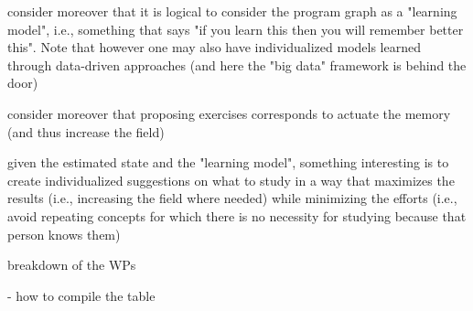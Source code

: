 









consider moreover that it is logical to consider the program graph as a "learning model", i.e., something that says "if you learn this then you will remember better this". Note that however one may also have individualized models learned through data-driven approaches (and here the "big data" framework is behind the door)

consider moreover that proposing exercises corresponds to actuate the memory (and thus increase the field)

given the estimated state and the "learning model", something interesting is to create individualized suggestions on what to study in a way that maximizes the results (i.e., increasing the field where needed) while minimizing the efforts (i.e., avoid repeating concepts for which there is no necessity for studying because that person knows them)



breakdown of the WPs

- how to compile the table
